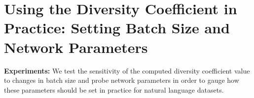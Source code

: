 
\section{Using the Diversity Coefficient in Practice: Setting Batch Size and Network Parameters}
\label{body:div_parameters}
\textbf{Experiments:}
We test the sensitivity of the computed diversity coefficient value to changes in batch size and probe network parameters in order to gauge how these parameters should be set in practice for natural language datasets. 

